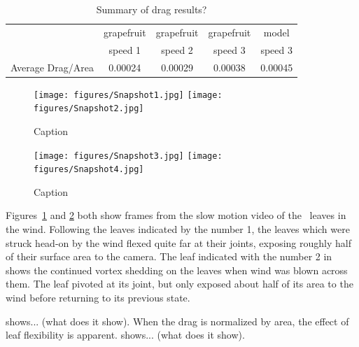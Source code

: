 
\begin{table}
\caption{Summary of drag results?}
\begin{center}
\begin{tabular}{ccccc}
      & grapefruit & grapefruit & grapefruit & model \\
      & speed 1 & speed 2 & speed 3 & speed 3 \\
     Average Drag/Area & 0.00024 & 0.00029 & 0.00038 & 0.00045
\end{tabular}
\end{center}
\end{table}

\begin{figure}
    \centering
    \texttt{[image: figures/Snapshot1.jpg]}
    \texttt{[image: figures/Snapshot2.jpg]}
    \caption{Caption}
    \label{fig:results1}
\end{figure}

\begin{figure}
    \centering
    \texttt{[image: figures/Snapshot3.jpg]}
    \texttt{[image: figures/Snapshot4.jpg]}
    \caption{Caption}
    \label{fig:results2}
\end{figure}

Figures~\ref{fig:results1} and \ref{fig:results2} both show frames from the slow motion video of the \Cxparadisi\ leaves in the wind. Following the leaves indicated by the number 1, the leaves which were struck head-on by the wind flexed quite far at their joints, exposing roughly half of their surface area to the camera. The leaf indicated with the number 2 in  shows the continued vortex shedding on the leaves when wind was blown across them. The leaf pivoted at its joint, but only exposed about half of its area to the wind before returning to its previous state.

 shows... (what does it show). When the drag is normalized by area, the effect of leaf flexibility is apparent.  shows... (what does it show). 

